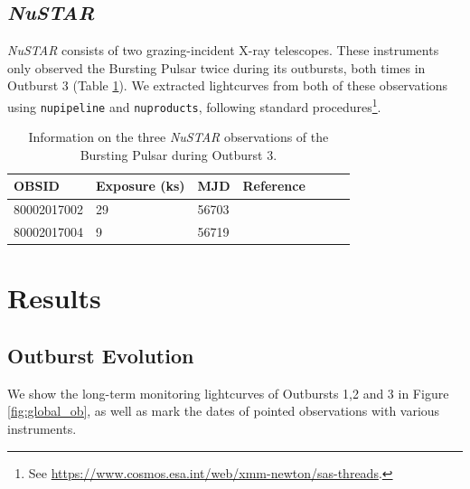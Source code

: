 \subsection{\textit{NuSTAR}}

\par \textit{NuSTAR} \citep{Harrison_NuSTAR} consists of two grazing-incident X-ray telescopes.  These instruments only observed the Bursting Pulsar twice during its outbursts, both times in Outburst 3 (Table \ref{tab:NuS}).  We extracted lightcurves from both of these observations using \texttt{nupipeline} and \texttt{nuproducts}, following standard procedures\footnote{See \url{https://www.cosmos.esa.int/web/xmm-newton/sas-threads}.}.

\begin{table}
\centering
\begin{tabular}{lllllll}
\hline
\hline
\scriptsize  OBSID &\scriptsize Exposure (ks) &\scriptsize MJD &\scriptsize Reference \\
\hline
80002017002 	& 29 & 56703 &  \citet{Dai_Hlags}  \\
80002017004 	& 9 & 56719 & \citet{Younes_Expo}\\
\hline
\hline
\end{tabular}
\caption{Information on the three \textit{NuSTAR} observations of the Bursting Pulsar during Outburst 3.}
\label{tab:NuS}
\end{table}

\section{Results}
\label{sec:Results}

\subsection{Outburst Evolution}

\par We show the long-term monitoring lightcurves of Outbursts 1,2 and 3 in Figure \ref{fig:global_ob}, as well as mark the dates of pointed observations with various instruments.

